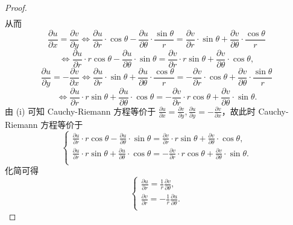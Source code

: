 \documentclass[../../main.tex]{subfiles}%
\begin{document}
\begin{proof}
\begin{gather*}
\end{gather*}
从而
\[
\frac{\partial u}{\partial x} = \frac{\partial v}{\partial y} \Longleftrightarrow \frac{\partial u}{\partial r} \cdot \cos\theta - \frac{\partial u}{\partial \theta} \cdot \frac{\sin\theta}{r} = \frac{\partial v}{\partial r} \cdot \sin\theta + \frac{\partial v}{\partial \theta} \cdot \frac{\cos\theta}{r}
\]
\[
\Longleftrightarrow \frac{\partial u}{\partial r} \cdot r\cos\theta - \frac{\partial u}{\partial \theta} \cdot \sin\theta = \frac{\partial v}{\partial r} \cdot r\sin\theta + \frac{\partial v}{\partial \theta} \cdot \cos\theta,
\]
\[
\frac{\partial u}{\partial y} = -\frac{\partial v}{\partial x} \Longleftrightarrow \frac{\partial u}{\partial r} \cdot \sin\theta + \frac{\partial u}{\partial \theta} \cdot \frac{\cos\theta}{r} = -\frac{\partial v}{\partial r} \cdot \cos\theta + \frac{\partial v}{\partial \theta} \cdot \frac{\sin\theta}{r}
\]
\[
\Longleftrightarrow \frac{\partial u}{\partial r} \cdot r\sin\theta + \frac{\partial u}{\partial \theta} \cdot \cos\theta = -\frac{\partial v}{\partial r} \cdot r\cos\theta + \frac{\partial v}{\partial \theta} \cdot \sin\theta.
\]
由 (i) 可知 Cauchy-Riemann 方程等价于 \( \frac{\partial u}{\partial x} = \frac{\partial v}{\partial y}, \frac{\partial u}{\partial y} = -\frac{\partial v}{\partial x} \)，故此时 Cauchy-Riemann 方程等价于
\[
\begin{cases}
\frac{\partial u}{\partial r} \cdot r\cos\theta - \frac{\partial u}{\partial \theta} \cdot \sin\theta = \frac{\partial v}{\partial r} \cdot r\sin\theta + \frac{\partial v}{\partial \theta} \cdot \cos\theta, \\
\frac{\partial u}{\partial r} \cdot r\sin\theta + \frac{\partial u}{\partial \theta} \cdot \cos\theta = -\frac{\partial v}{\partial r} \cdot r\cos\theta + \frac{\partial v}{\partial \theta} \cdot \sin\theta. \\
\end{cases}
\]
化简可得
\[
\begin{cases}
\frac{\partial u}{\partial r} = \frac{1}{r}\frac{\partial v}{\partial \theta}, \\
\frac{\partial v}{\partial r} = -\frac{1}{r}\frac{\partial u}{\partial \theta}. \\
\end{cases}
\]
\end{proof}
\end{document}

